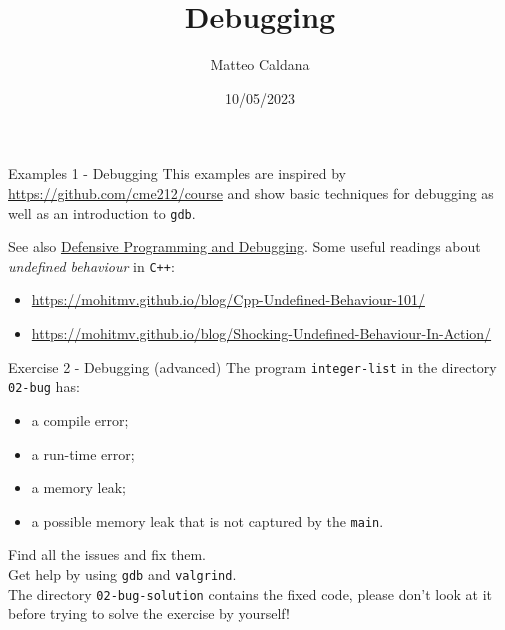 \documentclass[10pt,aspectratio=169]{beamer}
\begin{document}
    \title{Debugging}
    \author{Matteo Caldana}
    \date{10/05/2023}

\begin{frame}
    \maketitle
\end{frame}

\begin{frame}{Examples 1 - Debugging}
This examples are inspired by \url{https://github.com/cme212/course}
and show basic techniques for debugging as well as an introduction to \texttt{gdb}.

See also \href{https://gjbex.github.io/DPD-online-book/}{Defensive Programming and Debugging}.
\vfill
Some useful readings about \textit{undefined behaviour} in \texttt{C++}:
\begin{itemize}
\item \url{https://mohitmv.github.io/blog/Cpp-Undefined-Behaviour-101/}
\item \url{https://mohitmv.github.io/blog/Shocking-Undefined-Behaviour-In-Action/}
\end{itemize}
\end{frame}

\begin{frame}{Exercise 2 - Debugging (advanced)}
The program \texttt{integer-list} in the directory \texttt{02-bug} has:

\begin{itemize}
    \item a compile error;
    \item a run-time error;
    \item a memory leak;
    \item a possible memory leak that is not captured by the \texttt{main}.
\end{itemize}
\vspace{0.5cm}
Find all the issues and fix them. \\[3mm]

Get help by using \texttt{gdb} and \texttt{valgrind}.\\[3mm]

The directory \texttt{02-bug-solution} contains the fixed code,
please don't look at it before trying to solve the exercise by yourself!
\end{frame}
\end{document}
